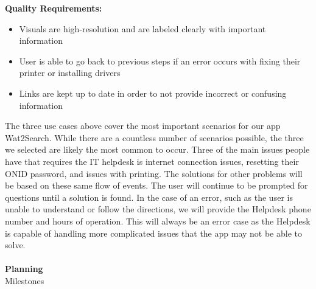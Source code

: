 \documentclass[12pt, letterpaper]{article}
\begin{document}
\begin{enumerate}
\begin{itemize}
\end{itemize}
\textbf{Quality Requirements:}
\begin{itemize}
	\item Visuals are high-resolution and are labeled clearly with important information
	\item User is able to go back to previous steps if an error occurs with fixing their printer or installing drivers
	\item Links are kept up to date in order to not provide incorrect or confusing information 
\end{itemize}
\end{enumerate}	
The three use cases above cover the most important scenarios for our app Wat2Search. While there are a countless number of scenarios possible, the three we selected are likely the most common to occur. Three of the main issues people have that requires the IT helpdesk is internet connection issues, resetting their ONID password, and issues with printing. The solutions for other problems will be based on these same flow of events. The user will continue to be prompted for questions until a solution is found. In the case of an error, such as the user is unable to understand or follow the directions, we will provide the Helpdesk phone number and hours of operation. This will always be an error case as the Helpdesk is capable of handling more complicated issues that the app may not be able to solve.
\\	
\\\textbf{Planning}
	\\Milestones
\end{document}
